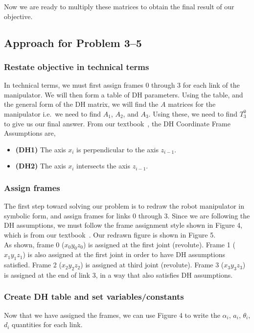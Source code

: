 \documentclass[conference]{IEEEtran}
\begin{document}
Now we are ready to multiply these matrices to obtain the final result
of our objective.

\subsection{Approach for Problem 3--5}

\subsubsection{Restate objective in technical terms}
In technical terms, we must first assign frames 0 through 3 for
each link of the manipulator. We will then form a table of DH
parameters. Using the table, and the general form of the DH matrix,
we will find the $A$ matrices for the manipulator i.e.\ we need to find
$A_1$, $A_2$, and $A_3$. Using these, we need to find $T^0_3$
to give us our final answer. From our textbook~\cite{Spong2006}, the 
DH Coordinate Frame Assumptions are,
\begin{itemize}
    \item \textbf{(DH1)} The axis $x_i$ is perpendicular to the axis $z_{i-1}$.
    \item \textbf{(DH2)} The axis $x_i$ intersects the axis $z_{i-1}$.
\end{itemize}
\vspace{0.1in}
\vspace{0.1in}
\subsubsection{Assign frames}
The first step toward solving our problem is to redraw the robot
manipulator in symbolic
form, and assign frames for links 0 through 3. Since we are following the DH assumptions,
we must follow the frame assignment style shown in Figure 4, which
is from our textbook~\cite{Spong2006}. Our redrawn figure is shown in Figure 5.\\

As shown, frame 0 ($x_0 y_0 z_0$) is assigned at the first joint (revolute). Frame 1
($x_1 y_1 z_1$) is also assigned at the
first joint in order to have DH assumptions satisfied. Frame 2 ($x_2 y_2 z_2$)
 is assigned at third joint (revolute). Frame 3 ($x_3 y_3 z_3$) is assigned at
the end of link 3, in a way that also satisfies DH assumptions.\\

\subsubsection{Create DH table and set variables/constants}
Now that we have assigned the frames, we can use Figure 4 to write
the $\alpha_i$, $a_i$, $\theta_i$, $d_i$ quantities for each link.
\end{document}
